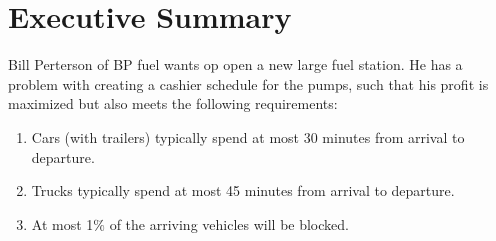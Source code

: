 \section{Executive Summary}
Bill Perterson of BP fuel wants op open a new large fuel station. He has a problem with creating a cashier schedule for the pumps, such that his profit is maximized but also meets the following requirements:
\begin{enumerate}
\item Cars (with  trailers) typically spend at most 30 minutes from arrival to departure.
\item Trucks typically spend at most 45 minutes from arrival to departure.
\item At most 1$\%$ of the arriving vehicles will be blocked.
\end{enumerate}